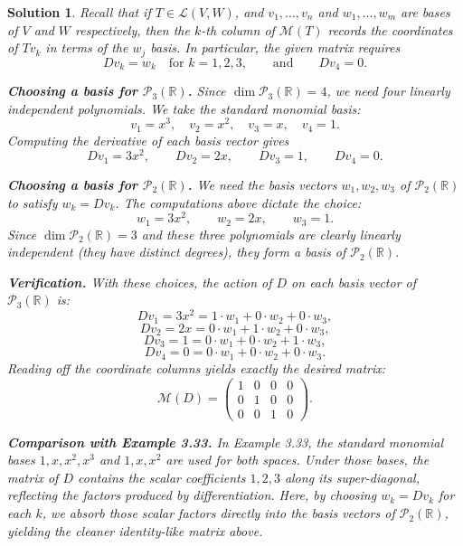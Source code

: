 \documentclass[12pt]{article}
\newtheorem*{solution}{Solution}
\begin{document}
\begin{solution}
Recall that if $T \in \mathcal{L}(V, W)$, and $v_1, \ldots, v_n$ and $w_1, \ldots, w_m$ are
bases of $V$ and $W$ respectively, then the $k$-th column of $\mathcal{M}(T)$ records the
coordinates of $Tv_k$ in terms of the $w_j$ basis. In particular, the given matrix requires
\[
  Dv_k = w_k \quad \text{for } k = 1, 2, 3, \qquad \text{and} \qquad Dv_4 = 0.
\]
 
\medskip
\noindent\textbf{Choosing a basis for $\mathcal{P}_3(\mathbb{R})$.}
Since $\dim \mathcal{P}_3(\mathbb{R}) = 4$, we need four linearly independent polynomials.
We take the standard monomial basis:
\[
  v_1 = x^3,\quad v_2 = x^2,\quad v_3 = x,\quad v_4 = 1.
\]
Computing the derivative of each basis vector gives
\[
  Dv_1 = 3x^2, \qquad Dv_2 = 2x, \qquad Dv_3 = 1, \qquad Dv_4 = 0.
\]
 
\medskip
\noindent\textbf{Choosing a basis for $\mathcal{P}_2(\mathbb{R})$.}
We need the basis vectors $w_1, w_2, w_3$ of $\mathcal{P}_2(\mathbb{R})$ to satisfy
$w_k = Dv_k$. The computations above dictate the choice:
\[
  w_1 = 3x^2, \qquad w_2 = 2x, \qquad w_3 = 1.
\]
Since $\dim \mathcal{P}_2(\mathbb{R}) = 3$ and these three polynomials are clearly linearly
independent (they have distinct degrees), they form a basis of $\mathcal{P}_2(\mathbb{R})$.
 
\medskip
\noindent\textbf{Verification.}
With these choices, the action of $D$ on each basis vector of $\mathcal{P}_3(\mathbb{R})$ is:
\[
  Dv_1 = 3x^2 = 1\cdot w_1 + 0\cdot w_2 + 0\cdot w_3,
\]
\[
  Dv_2 = 2x   = 0\cdot w_1 + 1\cdot w_2 + 0\cdot w_3,
\]
\[
  Dv_3 = 1    = 0\cdot w_1 + 0\cdot w_2 + 1\cdot w_3,
\]
\[
  Dv_4 = 0    = 0\cdot w_1 + 0\cdot w_2 + 0\cdot w_3.
\]
Reading off the coordinate columns yields exactly the desired matrix:
\[
  \mathcal{M}(D) =
  \begin{pmatrix}
    1 & 0 & 0 & 0 \\
    0 & 1 & 0 & 0 \\
    0 & 0 & 1 & 0
  \end{pmatrix}.
\]
 
\medskip
\noindent\textbf{Comparison with Example 3.33.}
In Example 3.33, the standard monomial bases $1, x, x^2, x^3$ and $1, x, x^2$ are used for
both spaces. Under those bases, the matrix of $D$ contains the scalar coefficients $1, 2, 3$
along its super-diagonal, reflecting the factors produced by differentiation. Here, by
choosing $w_k = Dv_k$ for each $k$, we \emph{absorb} those scalar factors directly into the
basis vectors of $\mathcal{P}_2(\mathbb{R})$, yielding the cleaner identity-like matrix above.
\end{solution}
 
\end{document}
